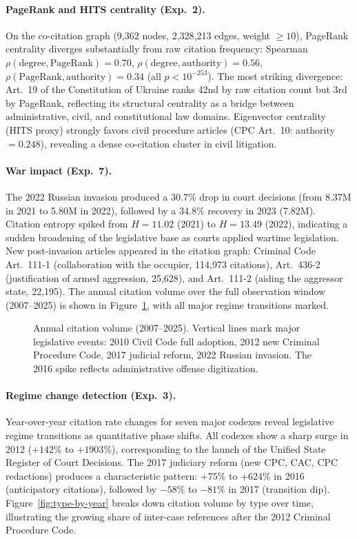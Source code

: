 \documentclass[11pt]{article}
\begin{document}
\paragraph{PageRank and HITS centrality (Exp.~2).}
On the co-citation graph (9,362 nodes, 2,328,213 edges, weight $\geq 10$), PageRank centrality diverges substantially from raw citation frequency: Spearman $\rho(\text{degree}, \text{PageRank}) = 0.70$, $\rho(\text{degree}, \text{authority}) = 0.56$, $\rho(\text{PageRank}, \text{authority}) = 0.34$ (all $p < 10^{-253}$).
The most striking divergence: Art.~19 of the Constitution of Ukraine ranks 42nd by raw citation count but 3rd by PageRank, reflecting its structural centrality as a bridge between administrative, civil, and constitutional law domains.
Eigenvector centrality (HITS proxy) strongly favors civil procedure articles (CPC Art.~10: authority $= 0.248$), revealing a dense co-citation cluster in civil litigation.

\paragraph{War impact (Exp.~7).}
The 2022 Russian invasion produced a 30.7\% drop in court decisions (from 8.37M in 2021 to 5.80M in 2022), followed by a 34.8\% recovery in 2023 (7.82M).
Citation entropy spiked from $H = 11.02$ (2021) to $H = 13.49$ (2022), indicating a sudden broadening of the legislative base as courts applied wartime legislation.
New post-invasion articles appeared in the citation graph: Criminal Code Art.~111-1 (collaboration with the occupier, 114,973 citations), Art.~436-2 (justification of armed aggression, 25,628), and Art.~111-2 (aiding the aggressor state, 22,195).
The annual citation volume over the full observation window (2007--2025) is shown in Figure~\ref{fig:temporal}, with all major regime transitions marked.

\begin{figure}[t]
\centering

\caption{Annual citation volume (2007--2025). Vertical lines mark major legislative events: 2010 Civil Code full adoption, 2012 new Criminal Procedure Code, 2017 judicial reform, 2022 Russian invasion. The 2016 spike reflects administrative offense digitization.}
\label{fig:temporal}
\end{figure}

\paragraph{Regime change detection (Exp.~3).}
Year-over-year citation rate changes for seven major codexes reveal legislative regime transitions as quantitative phase shifts.
All codexes show a sharp surge in 2012 ($+142\%$ to $+1903\%$), corresponding to the launch of the Unified State Register of Court Decisions.
The 2017 judiciary reform (new CPC, CAC, CPC redactions) produces a characteristic pattern: $+75\%$ to $+624\%$ in 2016 (anticipatory citations), followed by $-58\%$ to $-81\%$ in 2017 (transition dip).
Figure~\ref{fig:type-by-year} breaks down citation volume by type over time, illustrating the growing share of inter-case references after the 2012 Criminal Procedure Code.
\end{document}
